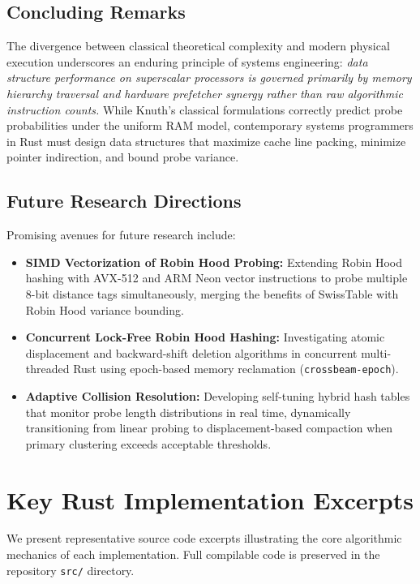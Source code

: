 \documentclass[conference]{IEEEtran}
\begin{document}
\subsection{Concluding Remarks}

The divergence between classical theoretical complexity and modern physical execution underscores an enduring principle of systems engineering: \emph{data structure performance on superscalar processors is governed primarily by memory hierarchy traversal and hardware prefetcher synergy rather than raw algorithmic instruction counts.} While Knuth's classical formulations correctly predict probe probabilities under the uniform RAM model, contemporary systems programmers in Rust must design data structures that maximize cache line packing, minimize pointer indirection, and bound probe variance.

\subsection{Future Research Directions}

Promising avenues for future research include:
\begin{itemize}
  \item \textbf{SIMD Vectorization of Robin Hood Probing:} Extending Robin Hood hashing with AVX-512 and ARM Neon vector instructions to probe multiple 8-bit distance tags simultaneously, merging the benefits of SwissTable with Robin Hood variance bounding.
  \item \textbf{Concurrent Lock-Free Robin Hood Hashing:} Investigating atomic displacement and backward-shift deletion algorithms in concurrent multi-threaded Rust using epoch-based memory reclamation (\texttt{crossbeam-epoch}).
  \item \textbf{Adaptive Collision Resolution:} Developing self-tuning hybrid hash tables that monitor probe length distributions in real time, dynamically transitioning from linear probing to displacement-based compaction when primary clustering exceeds acceptable thresholds.
\end{itemize}




\appendices

\section{Key Rust Implementation Excerpts}

We present representative source code excerpts illustrating the core algorithmic mechanics of each implementation. Full compilable code is preserved in the repository \texttt{src/} directory.
\end{document}
